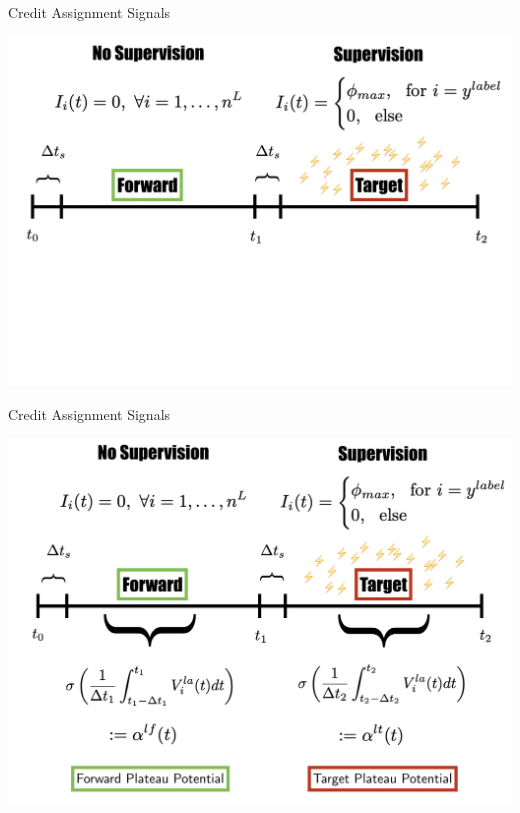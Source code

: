 \documentclass[dvipsnames, usenames]{beamer}
\begin{document}
\begin{frame}{Credit Assignment Signals}

\centering 
\includegraphics[width=1.05\textwidth]{../figures/report/phases_1}
         
\end{frame}
\begin{frame}[noframenumbering]{Credit Assignment Signals}

\centering 
\includegraphics[width=1.05\textwidth]{../figures/report/phases_2}         

\end{frame}
\end{document}
